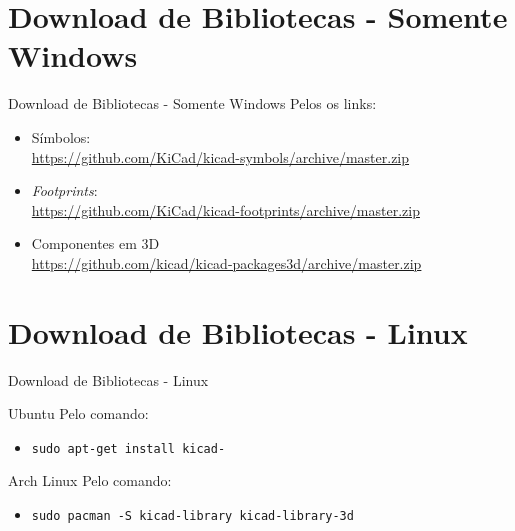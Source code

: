 \documentclass{beamer}
\begin{document}
\section{Download de Bibliotecas - Somente Windows}
\begin{frame}{Download de Bibliotecas - Somente Windows}
	Pelos os links:
	\begin{itemize}
		\item Símbolos: \\\url{https://github.com/KiCad/kicad-symbols/archive/master.zip}
		\item \textit{Footprints}: \\\url{https://github.com/KiCad/kicad-footprints/archive/master.zip}
		\item Componentes em 3D \\\url{https://github.com/kicad/kicad-packages3d/archive/master.zip}
	\end{itemize}
\end{frame}

\section{Download de Bibliotecas - Linux}
\begin{frame}{Download de Bibliotecas - Linux}
	\begin{block}{Ubuntu}
		Pelo comando:
		\begin{itemize}
			\item \texttt{sudo apt-get install kicad-}
		\end{itemize}
	\end{block}
	\begin{block}{Arch Linux}
		Pelo comando:
		\begin{itemize}
			\item \texttt{sudo pacman -S kicad-library kicad-library-3d}
		\end{itemize}
	\end{block}
\end{frame}

\begin{frame}
  \titlepage
\end{frame}
\end{document}
